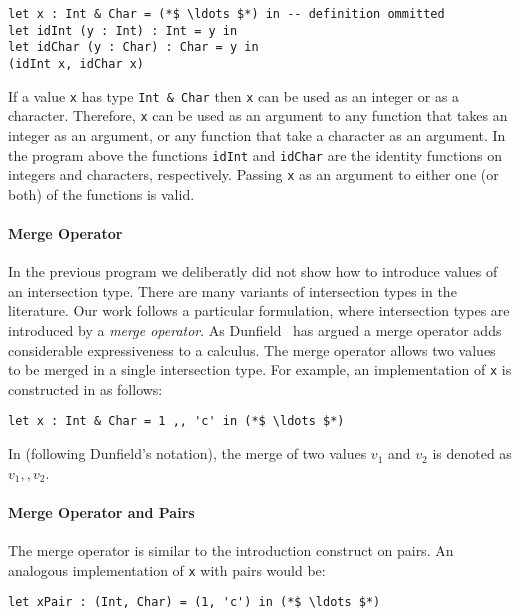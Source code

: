 \begin{lstlisting}
let x : Int & Char = (*$ \ldots $*) in -- definition ommitted
let idInt (y : Int) : Int = y in
let idChar (y : Char) : Char = y in
(idInt x, idChar x)
\end{lstlisting}

\noindent If a value \lstinline{x} has type \lstinline{Int & Char} then
\lstinline{x} can be used as an integer or as a character. Therefore,
\lstinline{x} can be used as an argument to any function that takes
an integer as an argument, or any
function that take a character as an argument. In the program above
the functions \lstinline{idInt} and \lstinline{idChar} are the
identity functions on integers and characters, respectively.
Passing \lstinline{x} as an argument to either one (or both) of the
functions is valid.

\paragraph{Merge Operator}
In the previous program we deliberatly did not show how to introduce values of an
intersection type. There are many variants of intersection types
in the literature. Our work follows a particular formulation, where
intersection types are introduced by a \emph{merge operator}.
As Dunfield~\cite{dunfield2014elaborating} has argued a merge operator adds considerable
expressiveness to a calculus. The merge operator allows
two values to be merged in a single intersection type. For example, an
implementation of \lstinline{x} is constructed in \name as follows:

\begin{lstlisting}
let x : Int & Char = 1 ,, 'c' in (*$ \ldots $*)
\end{lstlisting}

\noindent In \name (following Dunfield's notation), the
merge of two values $v_1$ and $v_2$ is denoted as $v_1 ,, v_2$.

\paragraph{Merge Operator and Pairs}
The merge operator is similar to the introduction construct on pairs.
An analogous implementation of \lstinline{x} with pairs would be:

\begin{lstlisting}
let xPair : (Int, Char) = (1, 'c') in (*$ \ldots $*)
\end{lstlisting}

